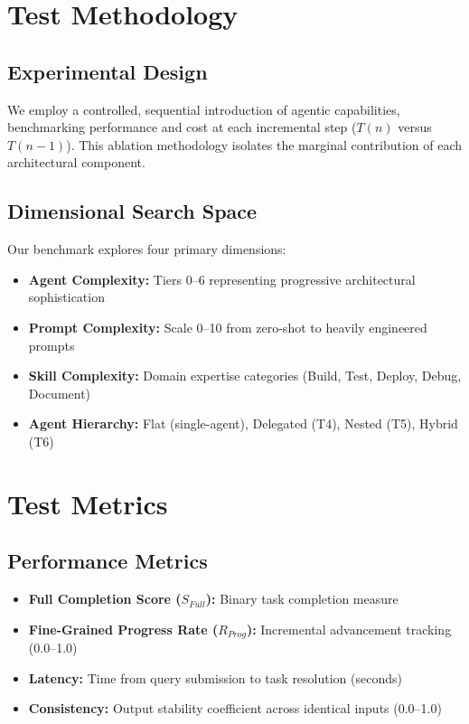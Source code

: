 \documentclass[11pt]{article}
\begin{document}
\section{Test Methodology}

\subsection{Experimental Design}
We employ a controlled, sequential introduction of agentic capabilities, benchmarking performance and cost at each incremental step ($T(n)$ versus $T(n-1)$). This ablation methodology isolates the marginal contribution of each architectural component.

\subsection{Dimensional Search Space}
Our benchmark explores four primary dimensions:

\begin{itemize}
    \item \textbf{Agent Complexity:} Tiers 0--6 representing progressive architectural sophistication
    \item \textbf{Prompt Complexity:} Scale 0--10 from zero-shot to heavily engineered prompts
    \item \textbf{Skill Complexity:} Domain expertise categories (Build, Test, Deploy, Debug, Document)
    \item \textbf{Agent Hierarchy:} Flat (single-agent), Delegated (T4), Nested (T5), Hybrid (T6)
\end{itemize}

\section{Test Metrics}

\subsection{Performance Metrics}
\begin{itemize}
    \item \textbf{Full Completion Score ($S_{Full}$):} Binary task completion measure
    \item \textbf{Fine-Grained Progress Rate ($R_{Prog}$):} Incremental advancement tracking (0.0--1.0)
    \item \textbf{Latency:} Time from query submission to task resolution (seconds)
    \item \textbf{Consistency:} Output stability coefficient across identical inputs (0.0--1.0)
\end{itemize}
\end{document}
